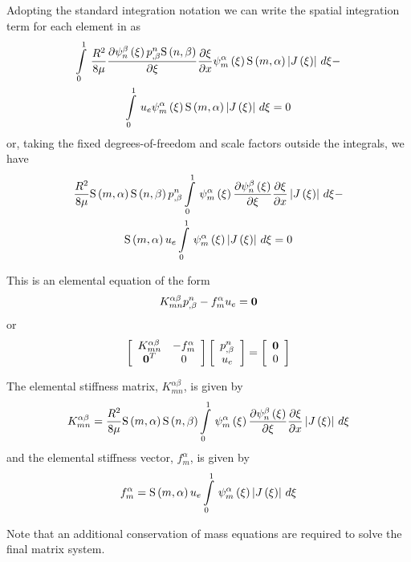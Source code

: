 Adopting the standard integration notation we can write the spatial
integration term for each element in  as
\begin{multline}
    \displaystyle\int\limits_{0}^{1} \,\frac{R^{2}}{8\mu} \dfrac{\partial    \psi_{n}^{\beta} \left( \xi \right)    {p}^{n} _{,\beta}    \mathrm{S} \left( n,\beta \right)  }{\partial \xi} 
     \dfrac{\partial \xi}{\partial x}    \psi_{m}^{\alpha} \left( \xi \right)     \mathrm{S} \left( m,\alpha \right)  \left|  J\left( \xi \right)  \right|\,d\xi - \\
    \displaystyle\int\limits_{0}^{1} \, u_{e}    \psi_{m}^{\alpha} \left( \xi \right)     \mathrm{S} \left( m,\alpha \right)  \left|  J\left( \xi \right)  \right|\,d\xi =0
  \label{eqn:Poiseullefemform1}
\end{multline}
or, taking the fixed degrees-of-freedom and scale factors outside the integrals, we have
\begin{multline}
  \frac{R^{2}}{8\mu}   \mathrm{S} \left( m,\alpha \right)     \mathrm{S} \left( n,\beta \right)    {p}^{n} _{,\beta}   \displaystyle\int\limits_{0}^{1} \,   \psi_{m}^{\alpha} \left( \xi \right)  
     \dfrac{\partial    \psi_{n}^{\beta} \left( \xi \right)  }{\partial \xi}  \dfrac{\partial \xi}{\partial x} \left|  J\left( \xi \right)  \right|\,d\xi - \\
     \mathrm{S} \left( m,\alpha \right)   u_{e}   \displaystyle\int\limits_{0}^{1} \,   \psi_{m}^{\alpha} \left( \xi \right)  \left|  J\left( \xi \right)  \right|\,d\xi =0
  \label{eqn:Poiseullefemform2}
\end{multline}

This is an elemental equation of the form
\begin{equation}
  K^{\alpha\beta}_{mn}\nodedof{p}{n}{\beta}-f^{\alpha}_{m}\elementdof{u}{e}=\vect{0}
\end{equation}
or
\begin{equation}
  \left[ \begin{array}{cc}
      K^{\alpha\beta}_{mn} & -f^{\alpha}_{m} \\
      \transpose{\vect{0}} & 0
    \end{array} \right] \left[ \begin{array}{c}
      \nodedof{p}{n}{\beta} \\
      \elementdof{u}{e}
    \end{array} \right] =  \left[ \begin{array}{c}
      \vect{0} \\
      0
    \end{array} \right]
\end{equation}

The elemental stiffness matrix, $K^{\alpha\beta}_{mn}$, is given by
\begin{equation}
  K^{\alpha\beta}_{mn}=\frac{R^{2}}{8\mu}   \mathrm{S} \left( m,\alpha \right)     \mathrm{S} \left( n,\beta \right)  
    \displaystyle\int\limits_{0}^{1} \,   \psi_{m}^{\alpha} \left( \xi \right)   \dfrac{\partial    \psi_{n}^{\beta} \left( \xi \right)  }{\partial \xi}  \dfrac{\partial \xi}{\partial x} 
    \left|  J\left( \xi \right)  \right|\,d\xi 
  \label{eqn:elementalfemlhs1}
\end{equation}
and the elemental stiffness vector, $f^{\alpha}_{m}$, is given by
\begin{equation}
  f^{\alpha}_{m}=   \mathrm{S} \left( m,\alpha \right)   u_{e}   \displaystyle\int\limits_{0}^{1} \,   \psi_{m}^{\alpha} \left( \xi \right)  
    \left|  J\left( \xi \right)  \right|\,d\xi 
  \label{eqn:elementalfemlhs2}
\end{equation}

Note that an additional conservation of mass equations are required to solve
the final matrix system.
